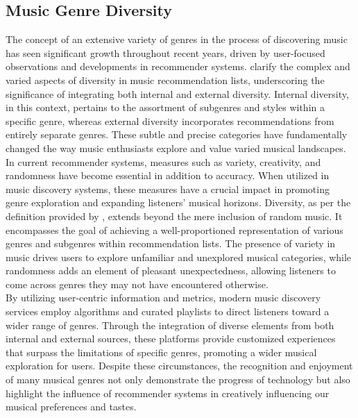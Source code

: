 \subsection{Music Genre Diversity}
The concept of an extensive variety of genres in the process of discovering music has seen significant growth throughout recent years, driven by user-focused observations and developments in recommender systems. \textcite{robinson20} clarify the complex and varied aspects of diversity in music recommendation lists, underscoring the significance of integrating both internal and external diversity. Internal diversity, in this context, pertains to the assortment of subgenres and styles within a specific genre, whereas external diversity incorporates recommendations from entirely separate genres. These subtle and precise categories have fundamentally changed the way music enthusiasts explore and value varied musical landscapes. \\

In current recommender systems, measures such as variety, creativity, and randomness have become essential in addition to accuracy. When utilized in music discovery systems, these measures have a crucial impact in promoting genre exploration and expanding listeners' musical horizons. Diversity, as per the definition provided by \textcite{robinson20}, extends beyond the mere inclusion of random music. It encompasses the goal of achieving a well-proportioned representation of various genres and subgenres within recommendation lists. The presence of variety in music drives users to explore unfamiliar and unexplored musical categories, while randomness adds an element of pleasant unexpectedness, allowing listeners to come across genres they may not have encountered otherwise. \\

By utilizing user-centric information and metrics, modern music discovery services employ algorithms and curated playlists to direct listeners toward a wider range of genres. Through the integration of diverse elements from both internal and external sources, these platforms provide customized experiences that surpass the limitations of specific genres, promoting a wider musical exploration for users. Despite these circumstances, the recognition and enjoyment of many musical genres not only demonstrate the progress of technology but also highlight the influence of recommender systems in creatively influencing our musical preferences and tastes.

